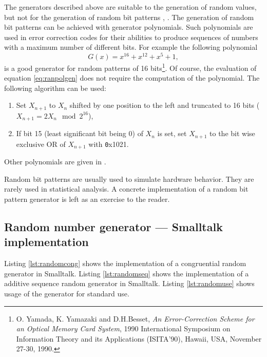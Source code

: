 The generators described above
are suitable to the generation of random values, but not for the
generation of random bit patterns \cite{Knuth2}, \cite{Press}. The
generation of random bit patterns can be achieved with generator
polynomials. Such polynomials are used in error correction codes
for their abilities to produce sequences of numbers with a maximum
number of different bits. For example the following polynomial
\begin{equation}
\label{eq:ranpolgen}
  G\left(x\right) = x^{16} + x^{12} +x^5 + 1,
\end{equation}
is a good generator for random patterns of 16 bits\footnote{\cf O.
Yamada, K. Yamazaki and D.H.Besset, {\em An Error-Correction
Scheme for an Optical Memory Card System}, 1990 International
Symposium on Information Theory and its Applications (ISITA'90),
Hawaii, USA, November 27-30, 1990.}. Of course, the evaluation of
equation \ref{eq:ranpolgen} does not require the computation of
the polynomial. The following algorithm can be used: {\parskip 0pt
\begin{enumerate}
  \item Set $X_{n+1}$ to $X_n$ shifted by one position to the left
  and truncated to 16 bits ($X_{n+1}=2X_n \mod 2^{16}$),
  \item If bit 15 (least significant bit being 0) of $X_n$ is set,
  set $X_{n+1}$ to the bit wise exclusive OR of $X_{n+1}$ with
  {\texttt 0x1021}.
\end{enumerate}}
\noindent Other polynomials are given in \cite{Press}.

Random bit patterns are usually used to simulate hardware
behavior. They are rarely used in statistical analysis. A concrete
implementation of a random bit pattern generator is left as an
exercise to the reader.

\subsection{Random number generator --- Smalltalk implementation}
 Listing \ref{lst:randomcong} shows
the implementation of a congruential random generator in Smalltalk.
Listing \ref{lst:randomseq} shows the implementation of a additive sequence random generator in Smalltalk.
Listing \ref{lst:randomuse} shows usage of the generator for standard use.

